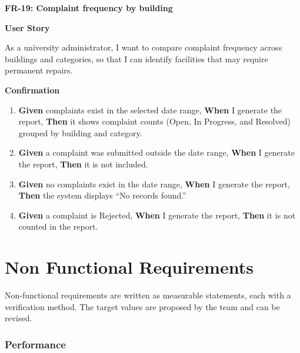 \noindent\textbf{FR-19: Complaint frequency by building}\par\nopagebreak[4]\smallskip
\noindent\textbf{User Story}\par\nopagebreak[4]
\noindent As a university administrator, I want to compare complaint frequency across buildings and categories, so that I can identify facilities that may require permanent repairs.\par\smallskip
{\makeatletter
{}
\makeatother
\noindent\textbf{Confirmation}\par\nopagebreak[4]\vspace{-6pt}\nopagebreak[4]
\begin{enumerate}\setlength{\itemsep}{2pt}\setlength{\parsep}{0pt}\setlength{\topsep}{2pt}\setlength{\partopsep}{0pt}
  \item \textbf{Given} complaints exist in the selected date range, \textbf{When} I generate the report, \textbf{Then} it shows complaint counts (Open, In Progress, and Resolved) grouped by building and category.
  \item \textbf{Given} a complaint was submitted outside the date range, \textbf{When} I generate the report, \textbf{Then} it is not included.
  \item \textbf{Given} no complaints exist in the date range, \textbf{When} I generate the report, \textbf{Then} the system displays ``No records found.''
  \item \textbf{Given} a complaint is Rejected, \textbf{When} I generate the report, \textbf{Then} it is not counted in the report.
\end{enumerate}}
\medskip
 
\section{Non Functional Requirements}
Non-functional requirements are written as measurable statements, each with a verification method. The target values are proposed by the team and can be revised.

\subsubsection*{Performance}

